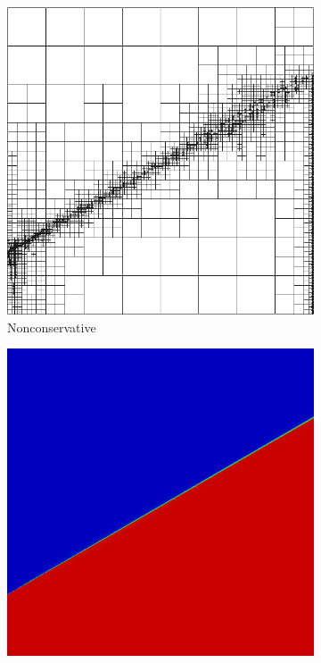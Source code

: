 \documentclass[letterpaper]{article}
\begin{document}
\begin{figure}[p]
\begin{subfigure}[t]{0.45\textwidth}
\includegraphics[width=\textwidth]{figs/InnerLayer/modified8nc_mesh.png}
\caption{Nonconservative}
\label{fig:innerlayer8nc}
\end{subfigure}
\begin{subfigure}[t]{0.45\textwidth}
\centering
\includegraphics[width=\textwidth]{figs/InnerLayer/modified8c.png}

\end{subfigure}
\end{figure}
\end{document}
